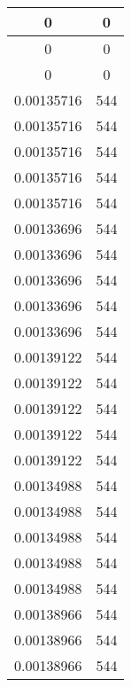 \begin{table}[]
\begin{tabular}[scale=0.5]{|c|c|}
		0                          & 0                     \\ \hline
		0                          & 0                     \\ \hline
		0                          & 0                     \\ \hline
		0.00135716                 & 544                   \\ \hline
		0.00135716                 & 544                   \\ \hline
		0.00135716                 & 544                   \\ \hline
		0.00135716                 & 544                   \\ \hline
		0.00135716                 & 544                   \\ \hline
		0.00133696                 & 544                   \\ \hline
		0.00133696                 & 544                   \\ \hline
		0.00133696                 & 544                   \\ \hline
		0.00133696                 & 544                   \\ \hline
		0.00133696                 & 544                   \\ \hline
		0.00139122                 & 544                   \\ \hline
		0.00139122                 & 544                   \\ \hline
		0.00139122                 & 544                   \\ \hline
		0.00139122                 & 544                   \\ \hline
		0.00139122                 & 544                   \\ \hline
		0.00134988                 & 544                   \\ \hline
		0.00134988                 & 544                   \\ \hline
		0.00134988                 & 544                   \\ \hline
		0.00134988                 & 544                   \\ \hline
		0.00134988                 & 544                   \\ \hline
		0.00138966                 & 544                   \\ \hline
		0.00138966                 & 544                   \\ \hline
		0.00138966                 & 544                   \\ \hline

\end{tabular}
\end{table}
